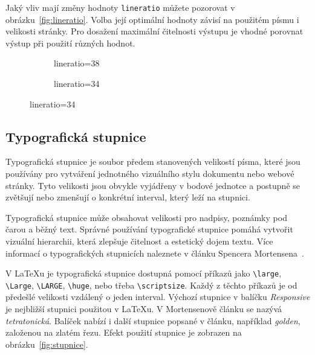 \documentclass{csbulletin}
\newcommand\balicek[1]{\textit{#1}}
\begin{document}
Jaký vliv mají změny hodnoty \texttt{lineratio} můžete pozorovat v obrázku~\ref{fig:lineratio}. 
Volba její optimální hodnoty závisí na použitém písmu i velikosti stránky. 
Pro dosažení maximální čitelnosti výstupu je vhodné porovnat výstup 
při použití různých hodnot.



\begin{figure}[tbp]
  \caption{Změna řádkového prokladu změnou hodnoty \texttt{lineratio}}\label{fig:lineratio}
  \begin{subfigure}[b]{0.45\textwidth}
\caption{lineratio=38}
\end{subfigure}
\begin{subfigure}[b]{0.45\textwidth}
\caption{lineratio=34}
\end{subfigure}
\end{figure}

\subsection{Typografická stupnice}

Typografická stupnice je soubor předem stanovených velikostí písma, které jsou
používány pro vytváření jednotného vizuálního stylu dokumentu nebo webové
stránky. Tyto velikosti jsou obvykle vyjádřeny v bodové jednotce a postupně se
zvětšují nebo zmenšují o konkrétní interval, který leží na stupnici.

Typografická stupnice může obsahovat velikosti pro nadpisy, poznámky pod čarou a běžný
text. Správné používání typografické stupnice pomáhá vytvořit vizuální
hierarchii, která zlepšuje čitelnost a estetický dojem textu. 
Více informací o typografických stupnicích naleznete v článku Spencera
Mortensena~\cite{mortensen}. 

V \LaTeX u je typografická stupnice dostupná pomocí příkazů jako \verb|\large|,
\verb|\Large|, \verb|\LARGE|, \verb|\huge|, nebo třeba \verb|\scriptsize|.
Každý z těchto příkazů je od předešlé velikosti vzdálený o jeden interval.
Výchozí stupnice v balíčku \balicek{Responsive} je nejbližší stupnici použitou
v \LaTeX u.  V Mortensenově článku se nazývá \textit{tetratonická}. Balíček
nabízí i další stupnice popsané v článku, například \textit{golden}, založenou
na zlatém řezu. Efekt použití stupnice je zobrazen na
obrázku~\ref{fig:stupnice}.
\end{document}
